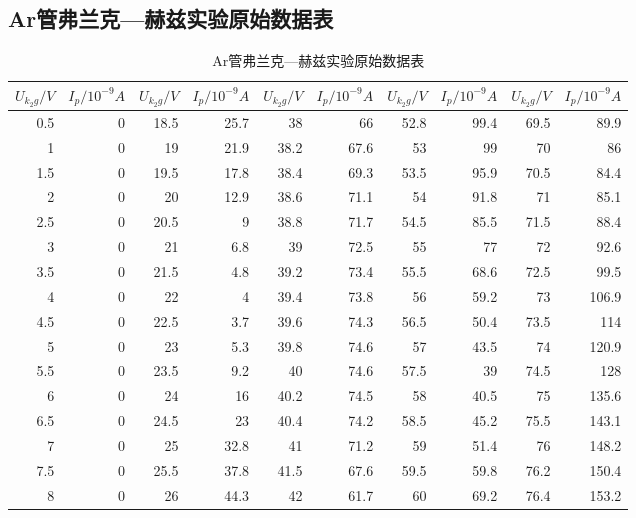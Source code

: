 \documentclass[a4 paper,12pt]{article}
\begin{document}
\subsection{Ar管弗兰克—赫兹实验原始数据表}
\begin{footnotesize}
	\centering
\begin{longtable}{||r|r||r|r||r|r||r|r||r|r||}
	\caption{Ar管弗兰克—赫兹实验原始数据表} 
	\label{Ar管弗兰克—赫兹实验原始数据表}\\
	\hline
	\hline
	$U_{k_{2}g}/V$&$I_{p}/10^{-9}A$&$U_{k_{2}g}/V$&$I_{p}/10^{-9}A$&$U_{k_{2}g}/V$&$I_{p}/10^{-9}A$&$U_{k_{2}g}/V$&$I_{p}/10^{-9}A$&$U_{k_{2}g}/V$&$I_{p}/10^{-9}A$\\
	\hline
	\hline
		0.5   & 0     & 18.5  & 25.7  & 38    & 66    & 52.8  & 99.4  & 69.5  & 89.9 \\
		1     & 0     & 19    & 21.9  & 38.2  & 67.6  & 53    & 99    & 70    & 86 \\
		1.5   & 0     & 19.5  & 17.8  & 38.4  & 69.3  & 53.5  & 95.9  & 70.5  & 84.4 \\
		2     & 0     & 20    & 12.9  & 38.6  & 71.1  & 54    & 91.8  & 71    & 85.1 \\
		2.5   & 0     & 20.5  & 9     & 38.8  & 71.7  & 54.5  & 85.5  & 71.5  & 88.4 \\
		3     & 0     & 21    & 6.8   & 39    & 72.5  & 55    & 77    & 72    & 92.6 \\
		3.5   & 0     & 21.5  & 4.8   & 39.2  & 73.4  & 55.5  & 68.6  & 72.5  & 99.5 \\
		4     & 0     & 22    & 4     & 39.4  & 73.8  & 56    & 59.2  & 73    & 106.9 \\
		4.5   & 0     & 22.5  & 3.7   & 39.6  & 74.3  & 56.5  & 50.4  & 73.5  & 114 \\
		5     & 0     & 23    & 5.3   & 39.8  & 74.6  & 57    & 43.5  & 74    & 120.9 \\
		5.5   & 0     & 23.5  & 9.2   & 40    & 74.6  & 57.5  & 39    & 74.5  & 128 \\
		6     & 0     & 24    & 16    & 40.2  & 74.5  & 58    & 40.5  & 75    & 135.6 \\
		6.5   & 0     & 24.5  & 23    & 40.4  & 74.2  & 58.5  & 45.2  & 75.5  & 143.1 \\
		7     & 0     & 25    & 32.8  & 41    & 71.2  & 59    & 51.4  & 76    & 148.2 \\
		7.5   & 0     & 25.5  & 37.8  & 41.5  & 67.6  & 59.5  & 59.8  & 76.2  & 150.4 \\
		8     & 0     & 26    & 44.3  & 42    & 61.7  & 60    & 69.2  & 76.4  & 153.2 \\

\end{longtable}
\end{footnotesize}
\end{document}

